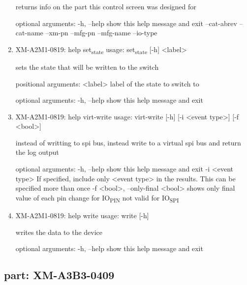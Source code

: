 \documentclass[11pt]{article}
\begin{document}
\begin{enumerate}
returns info on the part this control screen was designed for

optional arguments:
  -h, --help   show this help message and exit
  --cat-abrev
  --cat-name
  --xm-pn
  --mfg-pn
  --mfg-name
  --io-type

\item XM-A2M1-0819: help set\textsubscript{state}
\label{sec:orgc46e832}
usage: set\textsubscript{state} [-h] <label>

sets the state that will be written to the switch

positional arguments:
  <label>     label of the state to switch to

optional arguments:
  -h, --help  show this help message and exit

\item XM-A2M1-0819: help virt-write
\label{sec:org453b285}
usage: virt-write [-h] [-i <event type>] [-f <bool>]

instead of writting to spi bus, instead write to a virtual spi bus and return
the log output

optional arguments:
  -h, --help            show this help message and exit
  -i <event type>       If specified, include only <event type> in the
                        results. This can be specified more than once
  -f <bool>, --only-final <bool>
                        shows only final value of each pin change for IO\textsubscript{PIN}
                        not valid for IO\textsubscript{SPI}

\item XM-A2M1-0819: help write
\label{sec:orgc077f9a}
usage: write [-h]

writes the data to the device

optional arguments:
  -h, --help  show this help message and exit
\end{enumerate}

\subsection{part: XM-A3B3-0409}
\label{sec:orgca08873}
\end{document}
